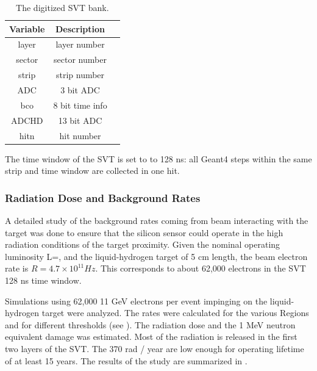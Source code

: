 \begin{table}[h]
	\begin{center}
		\begin{tabular}{| c | c | c |}
			\hline \hline
			Variable  & Description   \\
			\hline
               layer  &        layer number    \\
              sector  &       sector number    \\
               strip  &        strip number    \\
                 ADC  &           3 bit ADC    \\
                 bco  &     8 bit time info    \\
               ADCHD  &          13 bit ADC    \\
                hitn  &          hit number    \\
			\hline \hline
		\end{tabular}
	\end{center}
	\caption{The digitized SVT bank.}\label{tab:bstBank}
\end{table}

The time window  of the SVT is set to to 128 ns: all Geant4 steps within the same strip and time window are collected in one hit.

\subsubsection{Radiation Dose and Background Rates}
A detailed study of the background rates coming from beam interacting with the target was done to ensure that the silicon sensor
could operate in the high radiation conditions of the target proximity.
Given the nominal operating luminosity L=\cLuminosity, and the liquid-hydrogen target of 5 cm length, the beam electron rate
is $R=4.7 \times 10^{11} Hz$. This corresponds to about 62,000 electrons in the SVT 128 ns time window.

Simulations using 62,000 11 GeV electrons per event impinging on the liquid-hydrogen target were analyzed.
The rates were calculated for the various Regions and for different thresholds (see ).
The radiation dose and the 1 MeV neutron equivalent damage was estimated. Most of the radiation
is released in the first two layers of the SVT.
The 370 rad / year are low enough for operating lifetime of at least 15 years. The results of the study
are summarized in .


